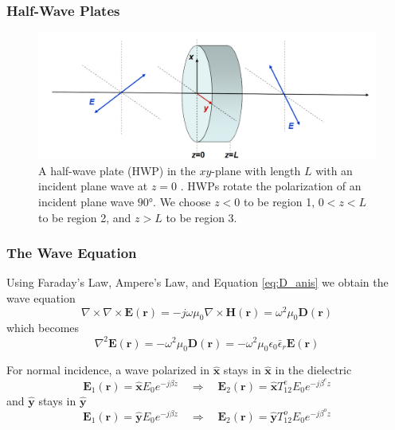 \documentclass[aspectratio=169,t,xcolor=table]{beamer}
\newcommand{\bv}[1]{\mathbf{#1}}
\newcommand{\vecc}[1]{\mathbf{#1}}
\begin{document}
\begin{frame}
    \frametitle{Half-Wave Plates}
    \begin{figure}[H]
        \centering
        \includegraphics[width=\textwidth]{figs/HWP.PNG}
        \caption{
            A half-wave plate (HWP) in the $xy$-plane with length $L$ with an incident
            plane wave at $z=0$ \cite{Wav_anis}. HWPs rotate the polarization
            of an incident plane wave $\ang{90}$. We choose $z<0$ to be region 
            1, $0<z<L$ to be region 2, and $z>L$ to be region 3.
        }
    \end{figure}
\end{frame}


\begin{frame}
    \frametitle{The Wave Equation}
    Using Faraday's Law, Ampere's Law, and Equation \ref{eq:D_anis} we obtain
    the wave equation \cite{Wav_anis, Balanis-2012}
    \begin{equation}\label{eq:WaveEQ}
        \nabla \times \nabla \times \vecc{E}(\vecc{r}) = 
        -j\omega \mu_0 \nabla \times \vecc{H}(\vecc{r}) = 
    \omega^2\mu_0 \vecc{D}(\vecc{r})
    \end{equation}
    which becomes
    \begin{equation}\label{eq:WaveEQ_simp}
        \nabla^2 \vecc{E}(\vecc{r}) =  -\omega^2\mu_0 \vecc{D}(\vecc{r})
        = -\omega^2\mu_0\epsilon_0 \bar{\epsilon}_r \vecc{E}(\vecc{r})
    \end{equation}
    
    For normal incidence, a
    wave polarized in $\bv{\hat{x}}$ stays in $\bv{\hat{x}}$ in the dielectric
    \begin{equation}
        \vecc{E}_1(\vecc{r}) = \bv{\hat{x}}E_0 e^{-j\beta z}
        \quad\Rightarrow\quad
        \vecc{E}_2(\vecc{r}) = \bv{\hat{x}}T_{12}^{e}E_0 e^{-j\beta^e z}
    \end{equation}
    and $\bv{\hat{y}}$ stays in $\bv{\hat{y}}$
    \begin{equation}
    \vecc{E}_1(\vecc{r}) = \bv{\hat{y}}E_0 e^{-j\beta z}
        \quad\Rightarrow\quad
        \vecc{E}_2(\vecc{r}) = \bv{\hat{y}}T_{12}^{o}E_0 e^{-j\beta^o z}
    \end{equation}
\end{frame}
\end{document}
